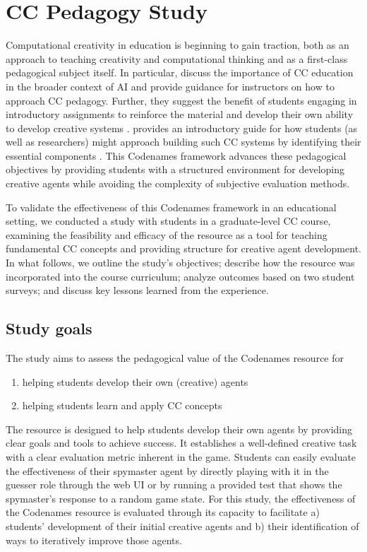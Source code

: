 \documentclass[phd,electronic,oneside,twosidetoc,letterpaper,chaptercenter,parttop,lof]{byumsphd}
\begin{document}
\section{CC Pedagogy Study}

Computational creativity in education is beginning to gain traction, both as an approach to teaching creativity and computational thinking \cite{kakavas2019,fragapane2021,yee-king2024} and as a first-class pedagogical subject itself.  In particular, \citeauthor{ackerman2017teaching} discuss the importance of CC education in the broader context of AI and provide guidance for instructors on how to approach CC pedagogy. Further, they suggest the benefit of students engaging in introductory assignments to reinforce the material and develop their own ability to develop creative systems \cite{ackerman2017teaching}. \citeauthor{ventura2017howto} provides an introductory guide for how students (as well as researchers) might approach building such CC systems by identifying their essential components \cite{ventura2017howto}. This Codenames framework advances these pedagogical objectives by providing students with a structured environment for developing creative agents while avoiding the complexity of subjective evaluation methods.

To validate the effectiveness of this Codenames framework in an educational setting, we conducted a study with students in a graduate-level CC course, examining the feasibility and efficacy of the resource as a tool for teaching fundamental CC concepts and providing structure for creative agent development.  In what follows, we outline the study's objectives;  describe how the resource was incorporated into the course curriculum; analyze outcomes based on two student surveys; and discuss key lessons learned from the experience.

\subsection{Study goals}

The study aims to assess the pedagogical value of the Codenames resource for

\begin{enumerate}
\item helping students develop their own (creative) agents
\item helping students learn and apply CC concepts
\end{enumerate}

The resource is designed to help students develop their own agents by providing clear goals and tools to achieve success.  It establishes a well-defined creative task with a clear evaluation metric inherent in the game. Students can easily evaluate the effectiveness of their spymaster agent by directly playing with it in the guesser role through the web UI or by running a provided test that shows the spymaster’s response to a random game state. For this study, the effectiveness of the Codenames resource is evaluated through its capacity to facilitate a) students' development of their initial creative agents and b) their identification of ways to iteratively improve those agents.
\end{document}
